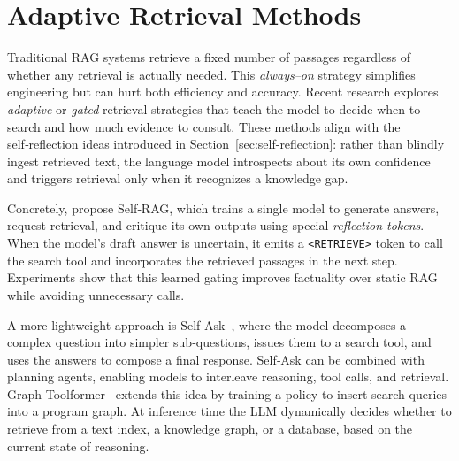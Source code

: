 \section{Adaptive Retrieval Methods}\label{sec:adaptive}
Traditional RAG systems retrieve a fixed number of passages regardless of whether any retrieval is actually needed.  This {\em always–on} strategy simplifies engineering but can hurt both efficiency and accuracy.  Recent research explores \emph{adaptive} or \emph{gated} retrieval strategies that teach the model to decide when to search and how much evidence to consult.  These methods align with the self‑reflection ideas introduced in Section~\ref{sec:self-reflection}: rather than blindly ingest retrieved text, the language model introspects about its own confidence and triggers retrieval only when it recognizes a knowledge gap.

Concretely, \citet{asai2023selfrag} propose Self‑RAG, which trains a single model to generate answers, request retrieval, and critique its own outputs using special \emph{reflection tokens}.  When the model’s draft answer is uncertain, it emits a \texttt{<RETRIEVE>} token to call the search tool and incorporates the retrieved passages in the next step.  Experiments show that this learned gating improves factuality over static RAG while avoiding unnecessary calls.

A more lightweight approach is Self‑Ask~\citep{press2022measuring}, where the model decomposes a complex question into simpler sub‑questions, issues them to a search tool, and uses the answers to compose a final response. Self‑Ask can be combined with planning agents, enabling models to interleave reasoning, tool calls, and retrieval.  Graph Toolformer~\citep{zhang2023graph} extends this idea by training a policy to insert search queries into a program graph.  At inference time the LLM dynamically decides whether to retrieve from a text index, a knowledge graph, or a database, based on the current state of reasoning.

